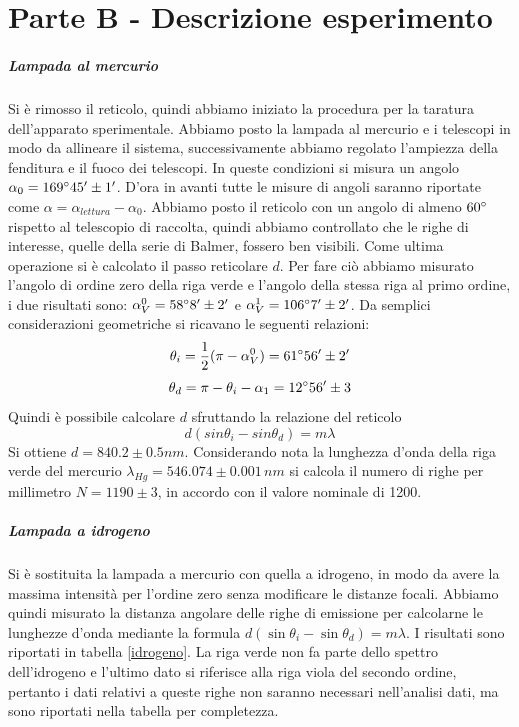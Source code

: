 \documentclass[10pt,a4paper]{article}
\begin{document}
\begin{table}[!htb]
\section{Parte B - Descrizione esperimento}
\subparagraph{Lampada al mercurio}
Si è rimosso il reticolo, quindi abbiamo iniziato la procedura per la taratura dell'apparato sperimentale. Abbiamo posto la lampada al mercurio e i telescopi in modo da allineare il sistema, successivamente abbiamo regolato l'ampiezza della fenditura e il fuoco dei telescopi. In queste condizioni si misura un angolo $\alpha_0 = 169 \degree 45 '\pm 1'$. D'ora in avanti tutte le misure di angoli saranno riportate come $\alpha=\alpha_{lettura}-\alpha_0$. Abbiamo posto il reticolo con un angolo di almeno $60\degree$ rispetto al telescopio di raccolta, quindi abbiamo controllato che le righe di interesse, quelle della serie di Balmer, fossero ben visibili.
Come ultima operazione si è calcolato il passo reticolare $d$. Per fare ciò abbiamo misurato l'angolo di ordine zero della riga verde e l'angolo della stessa riga al primo ordine, i due risultati sono: $\alpha_V^{0} = 58 \degree 8 ' \pm 2'$ e $\alpha_V^{1} = 106 \degree 7' \pm 2'$. Da semplici considerazioni geometriche si ricavano le seguenti relazioni:
\begin{equation}
\theta_i=\frac{1}{2}(\pi-\alpha_V^{0})=61\degree 56'\pm2'
\end{equation}
\begin{equation}
\theta_d=\pi-\theta_i-\alpha_1= 12 \degree 56' \pm 3
\end{equation}
Quindi è possibile calcolare $d$ sfruttando la relazione del reticolo 
\begin{equation}
d(sin{\theta_i}-sin{\theta_d})=m\lambda
\end{equation}
Si ottiene $d = 840.2 \pm 0.5 nm$. Considerando nota la lunghezza d'onda della riga verde del mercurio $\lambda_{Hg}=546.074\pm0.001\,nm$ si calcola il numero di righe per millimetro $N = 1190 \pm 3$, in accordo con il valore nominale di 1200.

\subparagraph{Lampada a idrogeno}
Si è sostituita la lampada a mercurio con quella a idrogeno, in modo da avere la massima intensità per l'ordine zero senza modificare le distanze focali. Abbiamo quindi misurato la distanza angolare delle righe di emissione per calcolarne le lunghezze d'onda mediante la formula $d(\sin{\theta_i}-\sin{\theta_d})=m\lambda$. I risultati sono riportati in tabella \ref{idrogeno}. La riga verde non fa parte dello spettro dell'idrogeno e l'ultimo dato si riferisce alla riga viola del secondo ordine, pertanto i dati relativi a queste righe non saranno necessari nell'analisi dati, ma sono riportati nella tabella per completezza.\\


\end{table}
\end{document}
